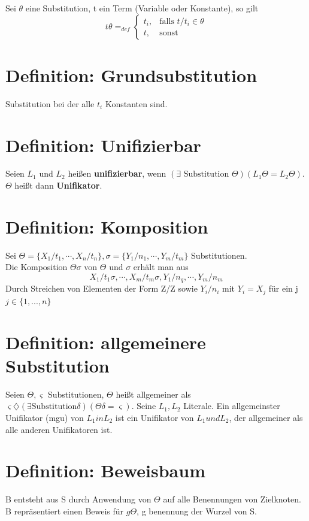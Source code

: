 \documentclass[12pt, a4paper]{article}
\begin{document}
Sei $\theta$ eine Substitution, t ein Term (Variable oder Konstante), so gilt \\

\begin{equation}
t\theta =_{def} \begin{cases} t_i, & \mbox{falls } t/t_i \in \theta \\ t, & \mbox{sonst} \end{cases}
\end{equation}

\section*{Definition: Grundsubstitution}
Substitution bei der alle $t_i$ Konstanten sind.

\section*{Definition: Unifizierbar}
Seien $L_1$ und $L_2$ heißen \textbf{unifizierbar}, wenn $(\exists \text{ Substitution } \Theta)(L_1\Theta = L_2\Theta)$. $\Theta$ heißt dann \textbf{Unifikator}.

\section*{Definition: Komposition}
Sei $\Theta = \{ X_1 / t_1, \cdots, X_n / t_n \}, \sigma = \{ Y_1 / n_1, \cdots, Y_m / t_m \}$ Substitutionen. \\
Die Komposition $\Theta\sigma$ von $\Theta$ und $\sigma$ erhält man aus 
\begin{equation}
X_1 / t_1\sigma, \cdots, X_m / t_m\sigma, Y_1 / n_q, \cdots, Y_m / n_m
\end{equation}
Durch Streichen von Elementen der Form Z/Z sowie $Y_i / n_i$ mit $Y_i = X_j$ für ein j$j \in \{1, ..., n\}$

\section*{Definition: allgemeinere Substitution}
Seien $\Theta, \varsigma$ Substitutionen, $\Theta$ heißt allgemeiner als $\varsigma \diamondsuit (\exists \text{Substitution} \delta)(\Theta \delta = \varsigma)$.
Seine $L_1, L_2$ Literale. Ein allgemeinster Unifikator (mgu) von $L_1 in L_2$ ist ein Unifikator von $L_1 und L_2$, der allgemeiner als alle anderen Unifikatoren ist.

\section*{Definition: Beweisbaum}
B entsteht aus S durch Anwendung von $\Theta$ auf alle Benennungen von Zielknoten. B repräsentiert einen Beweis für $g\Theta$, g benennung der Wurzel von S.
\end{document}
